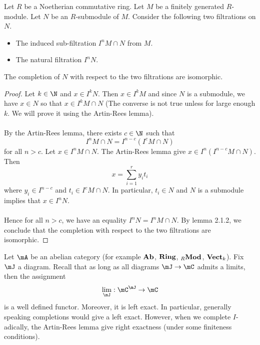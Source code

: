 \documentclass[a4paper]{article}
\begin{document}
\begin{prp}{}{}Let $R$ be a Noetherian commutative ring. Let $M$ be a finitely generated $R$-module. Let $N$ be an $R$-submodule of $M$. Consider the following two filtrations on $N$. 
\begin{itemize}
\item The induced sub-filtration $I^nM\cap N$ from $M$. 
\item The natural filtration $I^nN$. 
\end{itemize}
The completion of $N$ with respect to the two filtrations are isomorphic. \tcbline
\begin{proof}
Let $k\in\N$ and $x\in I^kN$. Then $x\in I^kM$ and since $N$ is a submodule, we have $x\in N$ so that $x\in I^kM\cap N$ (The converse is not true unless for large enough $k$. We will prove it using the Artin-Rees lemma). \\~\\

By the Artin-Rees lemma, there exists $c\in\N$ such that $$I^nM\cap N=I^{n-c}(I^cM\cap N)$$ for all $n>c$. Let $x\in I^nM\cap N$. The Artin-Rees lemma give $x\in I^n(I^{n-c}M\cap N)$. Then $$x=\sum_{i=1}^ry_it_i$$ where $y_i\in I^{n-c}$ and $t_i\in I^cM\cap N$. In particular, $t_i\in N$ and $N$ is a submodule implies that $x\in I^nN$. \\~\\

Hence for all $n>c$, we have an equality $I^nN=I^nM\cap N$. By lemma 2.1.2, we conclude that the completion with respect to the two filtrations are isomorphic. 
\end{proof}
\end{prp}

Let $\mA$ be an abelian category (for example $\bold{Ab}$, $\bold{Ring}$, ${_R\bold{Mod}}$, $\bold{Vect}_k$). Fix $\mJ$ a diagram. Recall that as long as all diagrams $\mJ\to\mC$ admits a limits, then the assignment $$\lim_\mJ:\mC^\mJ\to\mC$$ is a well defined functor. Moreover, it is left exact. In particular, generally speaking completions would give a left exact. However, when we complete $I$-adically, the Artin-Rees lemma give right exactness (under some finiteness conditions). 
\end{document}
